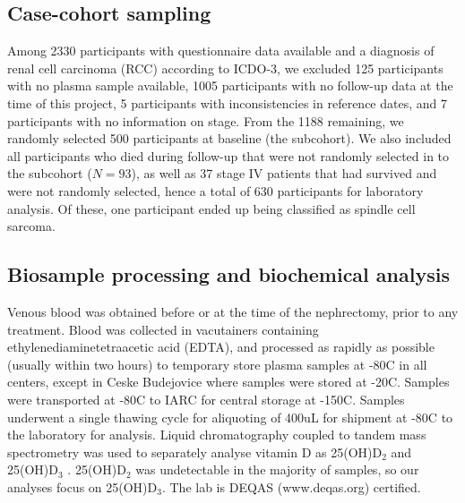 \documentclass[a4paper,11pt]{article}
\begin{document}
\subsection*{Case-cohort sampling}
Among 2330 participants with questionnaire data available and a diagnosis of 
renal cell carcinoma (RCC) according to ICDO-3, we excluded 125 participants 
with no plasma sample available, 1005 participants with no follow-up data at 
the time of this project, 5 participants with inconsistencies in reference 
dates, and 7 participants with no information on stage. From the 1188 
remaining, we randomly selected 500 participants at baseline (the subcohort). 
We also included all participants who died during follow-up that were not 
randomly selected in to the subcohort ($N=93$), as well as 37 stage IV patients 
that had survived and were not randomly selected, hence a total of 
630 participants for laboratory analysis. Of these, one participant ended up 
being classified as spindle cell sarcoma.

\subsection*{Biosample processing and biochemical analysis}
Venous blood was obtained before or at the time of the nephrectomy, prior to 
any treatment. Blood was collected in vacutainers containing 
ethylenediaminetetraacetic acid (EDTA), and processed as rapidly as possible 
(usually within two hours) to temporary store plasma samples at -80C in all 
centers, except in Ceske Budejovice where samples were stored at -20C. Samples 
were transported at -80C to IARC for central storage at -150C. Samples 
underwent a single thawing cycle for aliquoting of 400uL for shipment at -80C 
to the laboratory for analysis. Liquid chromatography coupled to tandem 
mass spectrometry was used to separately analyse vitamin D as 25(OH)D$_2$ and 
25(OH)D$_3$ \cite{midttun_determination_2011}. 25(OH)D$_2$ was undetectable in 
the majority of samples, so our analyses focus on 25(OH)D$_3$. The lab is DEQAS 
(www.deqas.org) certified.
\end{document}
